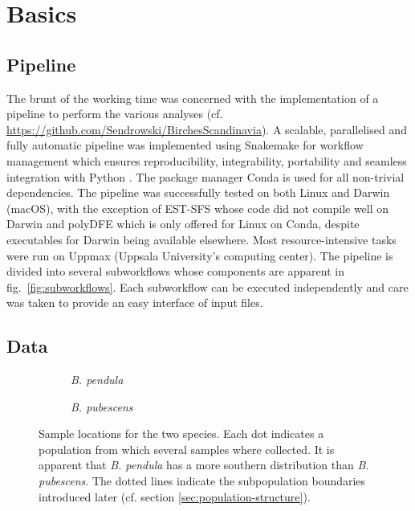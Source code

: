 \documentclass[hidelinks,11pt]{article}
\newcommand{\pendula}{\textit{B. pendula}}
\newcommand{\pubescens}{\textit{B. pubescens}}
\begin{document}
{    \clearpage

    \section{Basics}
    \label{sec:basics}

    \subsection{Pipeline}
    \label{sec:pipeline}

    The brunt of the working time was concerned with the implementation of a pipeline to perform the various analyses (cf. \url{https://github.com/Sendrowski/BirchesScandinavia}). A scalable, parallelised and fully automatic pipeline was implemented using Snakemake for workflow management which ensures reproducibility, integrability, portability and seamless integration with Python \cite{snakemake}. The package manager Conda is used for all non-trivial dependencies. The pipeline was successfully tested on both Linux and Darwin (macOS), with the exception of EST-SFS whose code did not compile well on Darwin and polyDFE which is only offered for Linux on Conda, despite executables for Darwin being available elsewhere. Most resource-intensive tasks were run on Uppmax (Uppsala University's computing center). The pipeline is divided into several subworkflows whose components are apparent in fig.~\ref{fig:subworkflows}. Each subworkflow can be executed independently and care was taken to provide an easy interface of input files.

    \subsection{Data}
    \label{sec:data}

    \begin{figure}[ht]
        \centering
        \begin{subfigure}[b]{0.47\textwidth}
            \centering
            \caption{\pendula{}}
            \label{fig:locations_pendula}
        \end{subfigure}
        \hfill
        \begin{subfigure}[b]{0.47\textwidth}
            \centering
            \caption{\pubescens{}}
            \label{fig:locations_pubescens}
        \end{subfigure}
        \caption{Sample locations for the two species. Each dot indicates a population from which several samples where collected. It is apparent that \pendula{} has a more southern distribution than \pubescens{}. The dotted lines indicate the subpopulation boundaries introduced later (cf. section \ref{sec:population-structure}).}
        \label{fig:locations}
    \end{figure}

}
\end{document}
